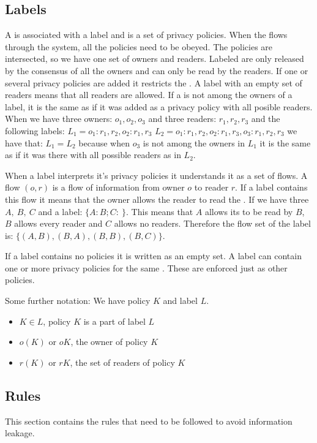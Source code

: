 \subsection{Labels}
A \xvalue{} is associated with a label and is a set of privacy policies.
When the \xvalue{} flows through the system, all the policies need to be obeyed.
The policies are intersected, so we have one set of owners and readers.
Labeled \xvalues{} are only released by the consensus of all the owners and can only be read by the readers.
If one or several privacy policies are added it restricts the \xvalue{}.
A label with an empty set of readers means that all readers are allowed.
If a \principal is not among the owners of a label, it is the same as if it was added as a privacy policy with all posible readers.
When we have three owners: $o_1, o_2, o_3$ and three readers: $r_1, r_2, r_3$ and the following labels:
$L_1 = {o_1: r_1,r_2, o_2: r_1, r_3}$ $L_2 = {o_1: r_1,r_2, o_2: r_1, r_3, o_3: r_1, r_2, r_3}$ we have that: $L_1 = L_2$ because when $o_3$ is not among the owners in $L_1$ it is the same as if it was there with all possible readers as in $L_2$.


When a label interprets it's privacy policies it understands it as a set of flows.
A flow $(o,r)$ is a flow of information from owner $o$ to reader $r$.
If a label contains this flow it means that the owner allows the reader to read the \xvalue{}.
If we have three \principals{} $A,\ B,\ C$ and a label: $\{A: B; C: \ \}$.
This means that $A$ allows its \xvalue{} to be read by $B$, $B$ allows every reader and $C$ allows no readers.
Therefore the flow set of the label is: $\{(A,B), (B,A), (B,B), (B,C) \}$.


If a label contains no policies it is written as an empty set.
A label can contain one or more privacy policies for the same \principal{}.
These are enforced just as other policies.

Some further notation:
We have policy $K$ and label $L$.
\begin{itemize}
\item $K \in L$, policy $K$ is a part of label $L$
\item $o(K)$ or $oK$, the owner of policy $K$
\item $r(K)$ or $rK$, the set of readers of policy $K$
\end{itemize}

\subsection{Rules}
This section contains the rules that need to be followed to avoid information leakage.

